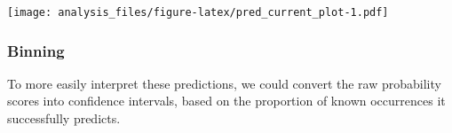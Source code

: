 \documentclass[]{article}
\newenvironment{Shaded}{\begin{snugshade}}{\end{snugshade}}
\newcommand{\DataTypeTok}[1]{\textcolor[rgb]{0.13,0.29,0.53}{#1}}
\newcommand{\KeywordTok}[1]{\textcolor[rgb]{0.13,0.29,0.53}{\textbf{#1}}}
\newcommand{\NormalTok}[1]{#1}
\newcommand{\OperatorTok}[1]{\textcolor[rgb]{0.81,0.36,0.00}{\textbf{#1}}}
\newcommand{\StringTok}[1]{\textcolor[rgb]{0.31,0.60,0.02}{#1}}
\begin{document}
\texttt{[image: analysis\_files/figure-latex/pred\_current\_plot-1.pdf]}

\hypertarget{binning}{%
\subsubsection{Binning}\label{binning}}

To more easily interpret these predictions, we could convert the raw
probability scores into confidence intervals, based on the proportion of
known occurrences it successfully predicts.

\begin{Shaded}
\end{Shaded}
\end{document}
